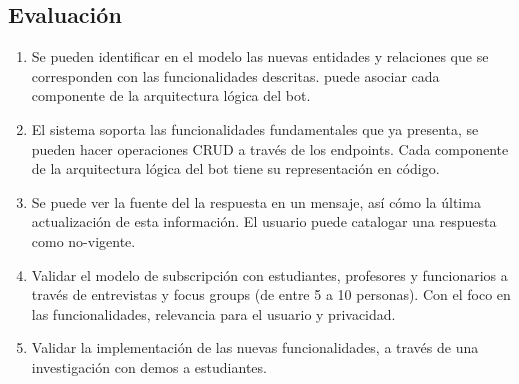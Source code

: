\documentclass[guia]{upropuesta}
\begin{document}
    \subsection*{Evaluación}\label{sec:eval}
        \begin{enumerate}
            \item Se pueden identificar en el modelo las nuevas entidades y relaciones que se corresponden con las funcionalidades descritas. puede asociar cada componente de la arquitectura lógica del bot.
            \item El sistema soporta las funcionalidades fundamentales que ya presenta, se pueden hacer operaciones CRUD a través de los endpoints. Cada componente de la arquitectura lógica del bot tiene su representación en código.
            \item  Se puede ver la fuente del la respuesta en un mensaje, así cómo la última actualización de esta información. El usuario puede catalogar una respuesta como no-vigente.
            \item Validar el modelo de subscripción con estudiantes, profesores y funcionarios a través de entrevistas y focus groups (de entre 5 a 10 personas). Con el foco en las funcionalidades, relevancia para el usuario y privacidad.
            \item Validar la implementación de las nuevas funcionalidades, a través de una investigación con demos a estudiantes. 
        \end{enumerate}
        
              
              
              
              
          
\end{document}
